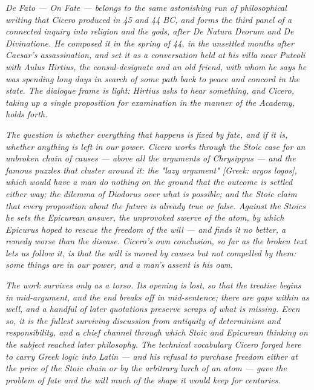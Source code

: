 
\textit{\textit{De Fato} --- On Fate --- belongs to the same astonishing
run of philosophical writing that Cicero produced in 45 and 44 BC, and
forms the third panel of a connected inquiry into religion and the gods,
after \textit{De Natura Deorum} and \textit{De Divinatione}. He composed
it in the spring of 44, in the unsettled months after Caesar's
assassination, and set it as a conversation held at his villa near
Puteoli with Aulus Hirtius, the consul-designate and an old friend, with
whom he says he was spending long days in search of some path back to
peace and concord in the state. The dialogue frame is light: Hirtius
asks to hear something, and Cicero, taking up a single proposition for
examination in the manner of the Academy, holds forth.}

\textit{The question is whether everything that happens is fixed by fate,
and if it is, whether anything is left in our power. Cicero works through
the Stoic case for an unbroken chain of causes --- above all the
arguments of Chrysippus --- and the famous puzzles that cluster around
it: the "lazy argument" \textit{[Greek: argos logos]}, which would have a
man do nothing on the ground that the outcome is settled either way; the
dilemma of Diodorus over what is possible; and the Stoic claim that every
proposition about the future is already true or false. Against the Stoics
he sets the Epicurean answer, the unprovoked swerve of the atom, by which
Epicurus hoped to rescue the freedom of the will --- and finds it no
better, a remedy worse than the disease. Cicero's own conclusion, so far
as the broken text lets us follow it, is that the will is moved by causes
but not compelled by them: some things are in our power, and a man's
assent is his own.}

\textit{The work survives only as a torso. Its opening is lost, so that
the treatise begins in mid-argument, and the end breaks off in
mid-sentence; there are gaps within as well, and a handful of later
quotations preserve scraps of what is missing. Even so, it is the fullest
surviving discussion from antiquity of determinism and responsibility,
and a chief channel through which Stoic and Epicurean thinking on the
subject reached later philosophy. The technical vocabulary Cicero forged
here to carry Greek logic into Latin --- and his refusal to purchase
freedom either at the price of the Stoic chain or by the arbitrary lurch
of an atom --- gave the problem of fate and the will much of the shape it
would keep for centuries.}
